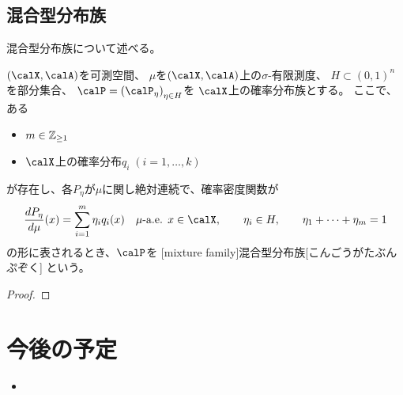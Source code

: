 \documentclass[report]{jlreq}
\begin{document}
\subsection{混合型分布族}

混合型分布族について述べる。

\begin{definition}[混合型分布族]
    $(\calX, \calA)$を可測空間、
    $\mu$を$(\calX, \calA)$上の$\sigma$-有限測度、
    $H \subset (0, 1)^n$を部分集合、
    $\calP = \myparen{\calP_\eta}_{\eta \in H}$を
    $\calX$上の確率分布族とする。
    ここで、ある
    \begin{itemize}
        \item $m \in \mathbb{Z}_{\ge 1}$
        \item $\calX$上の確率分布$q_i \; (i = 1, \dots, k)$
    \end{itemize}
    が存在し、各$P_\eta$が$\mu$に関し絶対連続で、確率密度関数が
    \begin{equation}
        \dd[P_\eta]{\mu}(x) = \sum_{i = 1}^m \eta_i q_i(x)
            \quad
            \text{$\mu$-a.e. $x \in \calX$},
            \qquad
            \eta_i \in H,
            \qquad
            \eta_1 + \cdots + \eta_m = 1
    \end{equation}
    の形に表されるとき、$\calP$を
    [mixture family]{混合型分布族}[こんごうがたぶんぷぞく]
    という。
\end{definition}

\begin{proposition}[負のエントロピー]
    \TODO{}
\end{proposition}

\begin{proof}
    \TODO{}
\end{proof}



%
\section{今後の予定}

\begin{itemize}
    \item \TODO{}
\end{itemize}
\end{document}
